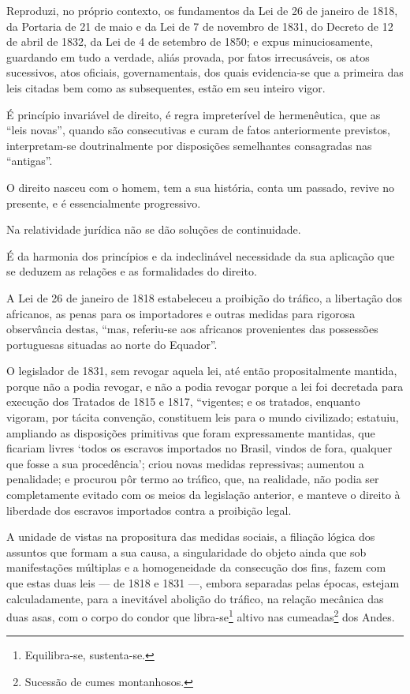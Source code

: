 Reproduzi, no próprio contexto, os fundamentos da Lei de 26 de janeiro
de 1818, da Portaria de 21 de maio e da Lei de 7 de novembro de 1831, do
Decreto de 12 de abril de 1832, da Lei de 4 de setembro de 1850; e expus
minuciosamente, guardando em tudo a verdade, aliás provada, por fatos
irrecusáveis, os atos sucessivos, atos oficiais, governamentais, dos
quais evidencia-se que a primeira das leis citadas bem como as
subsequentes, estão em seu inteiro vigor.

É princípio invariável de direito, é regra impreterível de hermenêutica,
que as ``leis novas'', quando são consecutivas e curam de fatos
anteriormente previstos, interpretam-se doutrinalmente por disposições
semelhantes consagradas nas ``antigas''.

O direito nasceu com o homem, tem a sua história, conta um passado,
revive no presente, e é essencialmente progressivo.

Na relatividade jurídica não se dão soluções de continuidade.

É da harmonia dos princípios e da indeclinável necessidade da sua
aplicação que se deduzem as relações e as formalidades do direito.

A Lei de 26 de janeiro de 1818 estabeleceu a proibição do tráfico, a
libertação dos africanos, as penas para os importadores e outras medidas
para rigorosa observância destas, ``mas, referiu-se aos africanos
provenientes das possessões portuguesas situadas ao norte do Equador''.

O legislador de 1831, sem revogar aquela lei, até então propositalmente
mantida, porque não a podia revogar, e não a podia revogar porque a lei
foi decretada para execução dos Tratados de 1815 e 1817, ``vigentes; e os %
tratados, enquanto vigoram, por tácita convenção, constituem leis para o
mundo civilizado; estatuiu, ampliando as disposições primitivas que
foram expressamente mantidas, que ficariam livres `todos os escravos
importados no Brasil, vindos de fora, qualquer que fosse a sua
procedência'; criou novas medidas repressivas; aumentou a penalidade; e
procurou pôr termo ao tráfico, que, na realidade, não podia ser
completamente evitado com os meios da legislação anterior, e manteve o
direito à liberdade dos escravos importados contra a proibição legal.

A unidade de vistas na propositura das medidas sociais, a filiação
lógica dos assuntos que formam a sua causa, a singularidade do objeto
ainda que sob manifestações múltiplas e a homogeneidade da consecução
dos fins, fazem com que estas duas leis --- de 1818 e 1831 ---, embora
separadas pelas épocas, estejam calculadamente, para a inevitável
abolição do tráfico, na relação mecânica das duas asas, com o corpo do
condor que libra-se\footnote{Equilibra-se, sustenta-se.} altivo nas
cumeadas\footnote{Sucessão de cumes montanhosos.} dos Andes.

